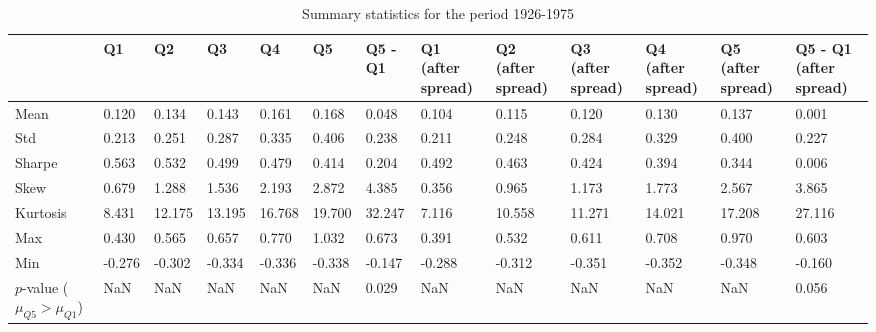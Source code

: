 \begin{table}
\caption{Summary statistics for the period 1926-1975}
\label{tab:summary_1926_1975}
\begin{tabular}{lllllllllllll}
\toprule
 & Q1 & Q2 & Q3 & Q4 & Q5 & Q5 - Q1 & Q1 (after spread) & Q2 (after spread) & Q3 (after spread) & Q4 (after spread) & Q5 (after spread) & Q5 - Q1 (after spread) \\
\midrule
Mean & 0.120 & 0.134 & 0.143 & 0.161 & 0.168 & 0.048 & 0.104 & 0.115 & 0.120 & 0.130 & 0.137 & 0.001 \\
Std & 0.213 & 0.251 & 0.287 & 0.335 & 0.406 & 0.238 & 0.211 & 0.248 & 0.284 & 0.329 & 0.400 & 0.227 \\
Sharpe & 0.563 & 0.532 & 0.499 & 0.479 & 0.414 & 0.204 & 0.492 & 0.463 & 0.424 & 0.394 & 0.344 & 0.006 \\
Skew & 0.679 & 1.288 & 1.536 & 2.193 & 2.872 & 4.385 & 0.356 & 0.965 & 1.173 & 1.773 & 2.567 & 3.865 \\
Kurtosis & 8.431 & 12.175 & 13.195 & 16.768 & 19.700 & 32.247 & 7.116 & 10.558 & 11.271 & 14.021 & 17.208 & 27.116 \\
Max & 0.430 & 0.565 & 0.657 & 0.770 & 1.032 & 0.673 & 0.391 & 0.532 & 0.611 & 0.708 & 0.970 & 0.603 \\
Min & -0.276 & -0.302 & -0.334 & -0.336 & -0.338 & -0.147 & -0.288 & -0.312 & -0.351 & -0.352 & -0.348 & -0.160 \\
$p$-value ($\mu_{Q5} > \mu_{Q1}$) & NaN & NaN & NaN & NaN & NaN & 0.029 & NaN & NaN & NaN & NaN & NaN & 0.056 \\
\bottomrule
\end{tabular}
\end{table}
